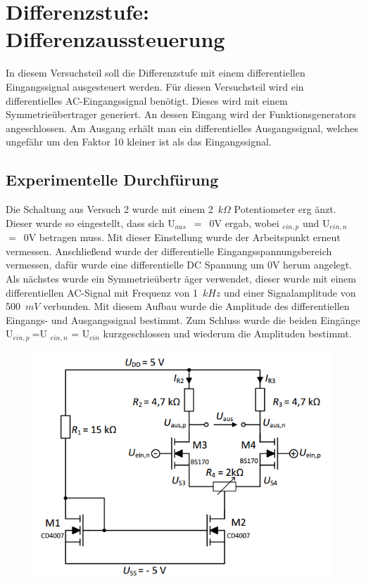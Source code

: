 \section{Differenzstufe: Differenzaussteuerung}
In diesem Versuchsteil soll die Differenzstufe mit einem differentiellen Eingangssignal
ausgesteuert werden.
F\"ur diesen Versuchsteil wird ein differentielles AC-Eingangssignal ben\"otigt. Dieses
wird mit einem Symmetrie\"ubertrager generiert. An dessen Eingang wird der
Funktionsgenerators angeschlossen. Am Ausgang erh\"alt man ein differentielles
Ausgangssignal, welches ungef\"ahr um den Faktor 10 kleiner ist als das
Eingangssignal.
\subsection{Experimentelle Durchf\"urung}
Die Schaltung aus Versuch 2 wurde mit einem 2~$k \Omega$ Potentiometer erg
\"anzt. Dieser wurde so eingestellt, dass sich U$_{aus}$~$=$~0V ergab, wobei 
$_{ein,p}$ und U$_{ein,n}$~$=$~0V betragen muss. Mit dieser Einstellung wurde 
der Arbeitspunkt erneut vermessen. Anschlie\ss end wurde der differentielle 
Eingangsspannungsbereich vermessen, daf\"ur wurde eine differentielle DC 
Spannung um 0V herum angelegt. Als n\"achstes wurde ein Symmetrie\"ubertr
\"ager verwendet, dieser wurde mit einem differentiellen AC-Signal mit 
Frequenz von 1~$kHz$ und einer Signalamplitude von 500~$mV$ verbunden. Mit 
diesem Aufbau wurde die Amplitude des differentiellen Eingangs- und 
Ausgangssignal bestimmt. Zum Schluss wurde die beiden Eing\"ange U$_{ein,p}~$=U
$_{ein,n} $ = U$_{ein}$ kurzgeschlossen und wiederum die Amplituden bestimmt.
\begin{figure}[!ht]
\begin{center}
\includegraphics[scale=0.8]{Differenzstufe1}
\end{center}
\end{figure}
